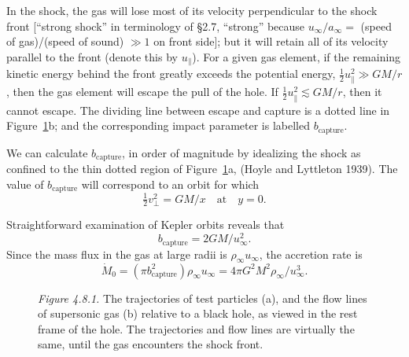 In the shock, the gas will lose most of its velocity perpendicular to the shock
front [``strong shock'' in terminology of \S2.7, ``strong'' because $u_\infty/a_\infty = $
(speed of gas)/(speed of sound) $\gg 1$ on front side]; but it will retain all of its
velocity parallel to the front (denote this by $u_\|$). For a given gas element, if the
remaining kinetic energy behind the front greatly exceeds the potential energy,
$\frac{1}{2}u_\|^2 \gg GM/r$, then the gas element will escape the pull of the hole. If $\frac{1}{2}u_\|^2 \lesssim GM/r$,
then it cannot escape. The dividing line between escape and capture is a dotted
line in Figure~\ref{fig:4.8.1}b; and the corresponding impact parameter is labelled
$b_{\text{capture}}$.

We can calculate $b_{\text{capture}}$, in order of magnitude by idealizing the shock as
confined to the thin dotted region of Figure~\ref{fig:4.8.1}a, (Hoyle and Lyttleton 1939).
The value of $b_{\text{capture}}$ will correspond to an orbit for which
\begin{equation}
\tfrac{1}{2} v_\perp^2 = GM/x \quad \text{at} \quad y = 0. \tag{4.8.3}
\end{equation}

Straightforward examination of Kepler orbits reveals that
\begin{equation}
b_{\text{capture}} = 2GM/u_\infty^2. \tag{4.8.3'}
\end{equation}
Since the mass flux in the gas at large radii is $\rho_\infty u_\infty$, the accretion rate is
\begin{equation}
\dot{M}_0 = (\pi b_{\text{capture}}^2)\rho_\infty u_\infty
= 4\pi G^2 M^2 \rho_\infty / u_\infty^3. \tag{4.8.4}
\end{equation}

\begin{figure}[htbp]
\centering
\caption{\textit{Figure 4.8.1.} The trajectories of test particles (a), and the flow lines of supersonic gas (b)
relative to a black hole, as viewed in the rest frame of the hole. The trajectories and flow
lines are virtually the same, until the gas encounters the shock front.}
\label{fig:4.8.1}
\end{figure}

